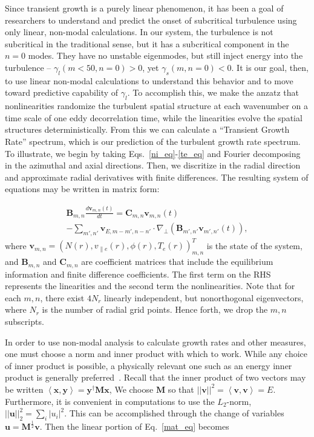 \documentclass[letter,scriptaddress,twocolumn, prl,showkeys]{revtex4}
\def\beqar{\begin{eqnarray}}
\def\eeqar{\end{eqnarray}}
\newcommand{\diff}[2]{\frac{d#1}{d#2}}
\def\grad{\nabla}
\newcommand{\gradperp}{\grad_\perp}
\newcommand{\vpe}{v_{\parallel e}}
\begin{document}
Since transient growth is a purely linear phenomenon, it has been a goal of researchers to understand and predict the onset of subcritical turbulence using only linear, non-modal calculations. 
In our system, the turbulence is not subcritical in the traditional sense, but it has a subcritical component in the $n=0$ modes. They have no unstable eigenmodes, but still inject energy into the
turbulence -- $\gamma_l(m<50,n=0) > 0$, yet $\gamma_s(m,n=0) < 0$. It is our goal, then, to use linear non-modal calculations to understand this behavior and to move toward predictive capability
of $\gamma_l$.
To accomplish this, we make the anzatz that nonlinearities randomize the turbulent spatial structure at each wavenumber on a time scale of 
one eddy decorrelation time, while the linearities evolve the spatial structures deterministically. From this we can calculate a ``Transient Growth Rate'' spectrum,
which is our prediction of the turbulent growth rate spectrum. To illustrate,
we begin by taking Eqs.~\ref{ni_eq}-\ref{te_eq} and Fourier decomposing in the azimuthal and axial directions.  Then, we discritize in the radial direction and
approximate radial derivatives with finite differences.  The resulting system of equations may be written in matrix form:

\beqar
\label{mat_eq}
\mathbf{B}_{m,n} \diff{\mathbf{v}_{m,n}(t)}{t} = \mathbf{C}_{m,n} \mathbf{v}_{m,n}(t) \nonumber \\
- \sum_{m',n'}  \mathbf{v}_{E,m-m',n-n'} \cdot \gradperp \left( \mathbf{B}_{m',n'} \mathbf{v}_{m',n'}(t) \right),
\eeqar
where $\mathbf{v}_{m,n} = \left( N(r), \vpe(r), \phi(r), T_e(r) \right)_{m,n}^{T}$ is the state of the system,
and $\mathbf{B}_{m,n}$ and $\mathbf{C}_{m,n}$ are coefficient matrices that include the equilibrium information and finite difference coefficients. The first term on the RHS represents the linearities
and the second term the nonlinearities. Note that for each $m,n$, there exist $4 N_r$ linearly independent, but nonorthogonal eigenvectors, where $N_r$ is the number of radial grid points. 
Hence forth, we drop the $m,n$ subscripts.

In order to use non-modal analysis to calculate growth rates and other measures, one must choose a norm and inner product with which to work. While any choice of
inner product is possible, a physically relevant one such as an energy inner product is generally preferred~\cite{camargo1998,schmid2007,camporeale2010}. 
Recall that the inner product of two vectors may be written $\left< \mathbf{x},\mathbf{y} \right> = \mathbf{y}^{\dagger} \mathbf{M} \mathbf{x}$,
We choose $\mathbf{M}$ so that $||\mathbf{v}||^2 = \left< \mathbf{v},\mathbf{v} \right> = E$. Furthermore, it is convenient in
computations to use the $L_2$-norm, $||\mathbf{u}||_2^2 = \sum_i |u_i|^2$. This can be accomplished through the change of variables $\mathbf{u} = \mathbf{M}^{\frac{1}{2}} \mathbf{v}$.
Then the linear portion of Eq.~\ref{mat_eq} becomes
\end{document}
